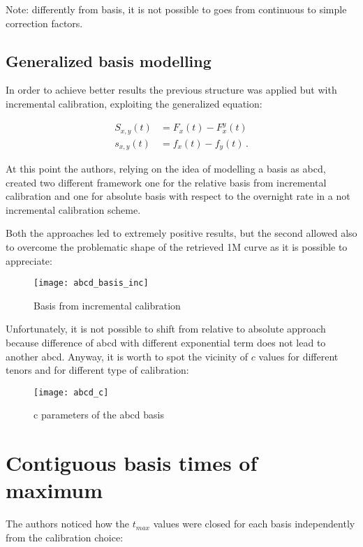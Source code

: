 Note: differently from basis, it is not possible to goes from continuous to simple correction factors.

\subsection{Generalized basis modelling}
In order to achieve better results the previous structure was applied but with incremental calibration, exploiting the generalized equation:

\begin{equation}
\begin{split}
S_{x,y}(t) &= F_x(t) - F_x^{y}(t)\\
s_{x,y}(t) &= f_x(t) - f_{y}(t)\,.
\end{split}
\end{equation}

At this point the authors, relying on the idea of modelling a basis as abcd, created two different framework one for the relative basis from incremental calibration and one for absolute basis with respect to the overnight rate in a not incremental calibration scheme.

Both the approaches led to extremely positive results, but the second allowed also to overcome the problematic shape of the retrieved 1M curve as it is possible to appreciate:

\begin{figure}[H]
\centering
\texttt{[image: abcd\_basis\_inc]}
\caption{Basis from incremental calibration }
\label{fig:abcd_basis_inc}
\end{figure}

Unfortunately, it is not possible to shift from relative to absolute approach because difference of abcd with different exponential term does not lead to another abcd.
Anyway, it is worth to spot the vicinity of $c$ values for different tenors and for different type of calibration:

\begin{figure}[H]
\centering
\texttt{[image: abcd\_c]}
\caption{c parameters of the abcd basis}
\label{fig:abcd_c}
\end{figure}


\section{Contiguous basis times of maximum}

The authors noticed how the $t_{max}$ values were closed for each basis independently from the calibration choice:

